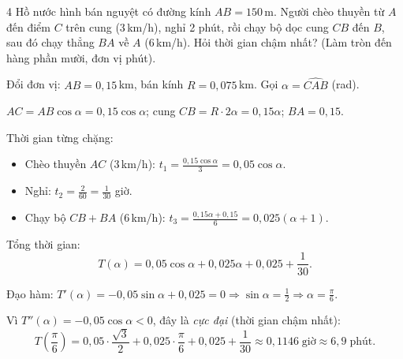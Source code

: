 \begin{baitoan}{4 \hfill {}}
Hồ nước hình bán nguyệt có đường kính $AB = 150$\,m. Người chèo thuyền từ $A$ đến điểm $C$ trên cung (3\,km/h), nghỉ 2 phút, rồi chạy bộ dọc cung $CB$ đến $B$, sau đó chạy thẳng $BA$ về $A$ (6\,km/h). Hỏi thời gian chậm nhất? (Làm tròn đến hàng phần mười, đơn vị phút).

\begin{center}
\end{center}
\end{baitoan}

\begin{loigiai}
Đổi đơn vị: $AB = 0{,}15$\,km, bán kính $R = 0{,}075$\,km. Gọi $\alpha = \widehat{CAB}$ (rad).

$AC = AB \cos\alpha = 0{,}15\cos\alpha$; cung $CB = R \cdot 2\alpha = 0{,}15\alpha$; $BA = 0{,}15$.

Thời gian từng chặng:
\begin{itemize}
  \item Chèo thuyền $AC$ (3\,km/h): $t_1 = \frac{0{,}15\cos\alpha}{3} = 0{,}05\cos\alpha$.
  \item Nghỉ: $t_2 = \frac{2}{60} = \frac{1}{30}$ giờ.
  \item Chạy bộ $CB + BA$ (6\,km/h): $t_3 = \frac{0{,}15\alpha + 0{,}15}{6} = 0{,}025(\alpha + 1)$.
\end{itemize}

Tổng thời gian:
\[ T(\alpha) = 0{,}05\cos\alpha + 0{,}025\alpha + 0{,}025 + \frac{1}{30}. \]

Đạo hàm: $T'(\alpha) = -0{,}05\sin\alpha + 0{,}025 = 0 \Rightarrow \sin\alpha = \frac{1}{2} \Rightarrow \alpha = \frac{\pi}{6}$.

Vì $T''(\alpha) = -0{,}05\cos\alpha < 0$, đây là \textit{cực đại} (thời gian chậm nhất):
\[ T\!\left(\frac{\pi}{6}\right) = 0{,}05 \cdot \frac{\sqrt{3}}{2} + 0{,}025 \cdot \frac{\pi}{6} + 0{,}025 + \frac{1}{30} \approx 0{,}1146\;\text{giờ} \approx \boxed{6{,}9\;\text{phút}}. \]
\end{loigiai}

